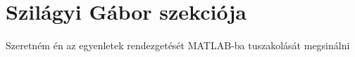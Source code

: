 \section{Szilágyi Gábor szekciója}
    Szeretném én az egyenletek rendezgetését MATLAB-ba tuszakolását megsinálni
